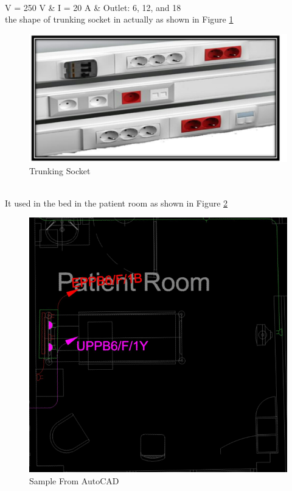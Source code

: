 \documentclass[12pt,fleqn]{book} %
\begin{document}
\begin{enumerate}
\\ V = 250 V & I = 20 A & Outlet: 6, 12, and 18
\\the shape of trunking socket in actually  as shown in Figure \ref{fig:s 7}
\begin{figure}[h!]
    \centering
    \includegraphics[width=0.8\linewidth]{s 7.png}
    \caption{  Trunking Socket  }
    \label{fig:s 7}
\end{figure}
\\It used in the bed in the patient room as shown in Figure \ref{fig:s 10}
\begin{figure}[h!]
    \centering
    \includegraphics[width=0.7\linewidth]{s 10.png}
    \caption{  Sample From AutoCAD  }
    \label{fig:s 10}
\end{figure}


\end{enumerate}
\end{document}
